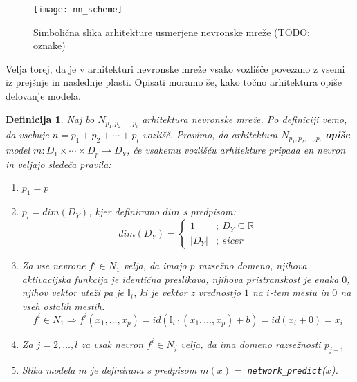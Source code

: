 \documentclass[12pt,a4paper]{article}
\newtheorem{definicija}{Definicija}
\begin{document}
\begin{figure}[h!]

\begin{center}
\texttt{[image: nn\_scheme]}
\end{center}

\caption{Simbolična slika arhitekture usmerjene nevronske mreže (TODO: oznake)}
\end{figure}

Velja torej, da je v arhitekturi nevronske mreže vsako vozlišče povezano z vsemi iz prejšnje in naslednje plasti. 
Opisati moramo še, kako točno arhitektura opiše delovanje modela.

\begin{definicija}

Naj bo $N_{p_1,p_2,\ldots,p_l}$ arhitektura nevronske mreže. Po definiciji vemo, da vsebuje $n= p_1+p_2+\cdots+p_l$ vozlišč. Pravimo, da arhitektura $N_{p_1,p_2,\ldots,p_l}$ \textbf{opiše} model $m: D_1 \times \cdots \times D_p \rightarrow D_Y$, če vsakemu vozlišču arhitekture pripada en nevron in veljajo sledeča pravila:

\begin{enumerate}
  \item $ p_1 = p$

  \item $p_l = dim(D_Y)$, kjer definiramo $dim$ s predpisom:
  \[
	  dim(D_Y) =
	  \begin{cases}
		1 &;\ D_Y \subseteq \mathbb{R} \\
		|D_Y| &;\ sicer
	  \end{cases}	
  \]%

  \item Za vse nevrone $f^i \in N_1$ velja, da imajo $p$ razsežno domeno, njihova aktivacijska funkcija je identična preslikava, njihova pristranskost je enaka $0$, njihov vektor uteži pa je $\mathbb{I}_i$, ki je vektor z vrednostjo $1$ na $i$-tem mestu in $0$ na vseh ostalih mestih.
$$
f^i \in N_1 \Rightarrow f^i(x_1,\ldots,x_p) = id(\mathbb{I}_i \cdot (x_1,\ldots,x_p) + b) = id(x_i+0) = x_i
$$
  \item Za $j=2,\ldots,l$ za vsak nevron $f^i \in N_j$ velja, da ima domeno razsežnosti $p_{j-1}$

  \item Slika modela $m$ je definirana s predpisom $m(x) =$ \texttt{network\_predict}($x$).


\end{enumerate}
\end{definicija}
\end{document}
